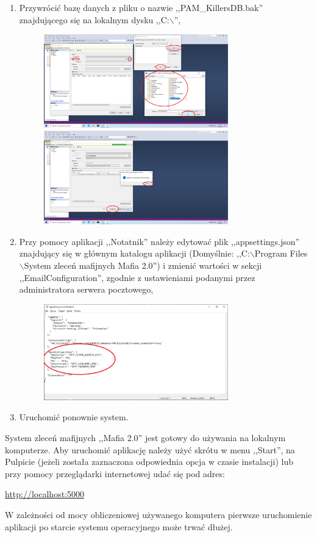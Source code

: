 \documentclass[12pt,a4paper]{article}
\begin{document}
\begin{enumerate}
				\item Przywrócić bazę danych z pliku o nazwie ,,PAM\_KillersDB.bak'' znajdującego się na lokalnym dysku ,,C:$\backslash$'',
					\begin{figure}[H]
						\centering
						\includegraphics[width=8cm]{img/Local_Install_11.eps}\\
						\includegraphics[width=8cm]{img/Local_Install_12.eps}
					\end{figure}
									
				\item Przy pomocy aplikacji ,,Notatnik'' należy edytować plik ,,appsettings.json'' znajdujący się w głównym katalogu aplikacji (Domyślnie:
					,,C:$\backslash$Program Files$\backslash$System zleceń mafijnych Mafia 2.0'') i zmienić wartości w sekcji ,,EmailConfiguration'', zgodnie z ustawieniami podanymi
					przez administratora serwera pocztowego,
					\begin{figure}[H]
						\centering
						\includegraphics[width=8cm]{img/Local_Install_13.eps}
					\end{figure}				
					
				\item Uruchomić ponownie system.
			\end{enumerate}
			System zleceń mafijnych ,,Mafia 2.0'' jest gotowy do używania na lokalnym komputerze. Aby uruchomić aplikację należy użyć skrótu w menu ,,Start'', na Pulpicie (jeżeli została
			zaznaczona odpowiednia opcja w czasie instalacji) lub przy pomocy przeglądarki internetowej udać się pod adres:
			\begin{tcolorbox}[minipage,colback=white,arc=0pt,outer arc=0pt, fontupper=\footnotesize]
				\url {http://localhost:5000}
			\end{tcolorbox}
			\noindent W zależności od mocy obliczeniowej używanego komputera pierwsze uruchomienie aplikacji po starcie systemu operacyjnego może trwać dłużej.		
		
\end{document}
